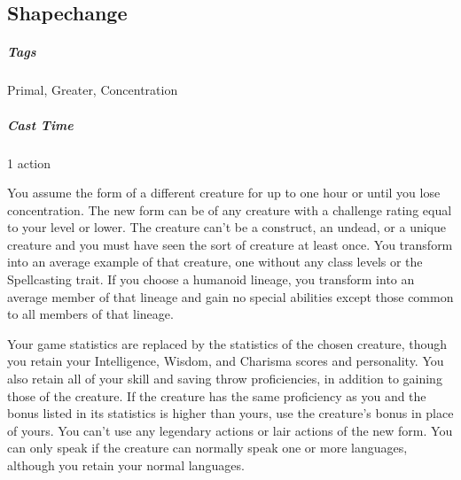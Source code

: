 








\subsection{Shapechange}\label{spell:shapechange}
\subparagraph*{Tags} Primal, Greater, Concentration
\subparagraph*{Cast Time} 1 action

You assume the form of a different creature for up to one hour or until you lose concentration. The new form can be of any creature with a challenge rating equal to your level or lower. The creature can't be a construct, an undead, or a unique creature and you must have seen the sort of creature at least once. You transform into an average example of that creature, one without any class levels or the Spellcasting trait. If you choose a humanoid lineage, you transform into an average member of that lineage and gain no special abilities except those common to all members of that lineage.

Your game statistics are replaced by the statistics of the chosen creature, though you retain your Intelligence, Wisdom, and Charisma scores and personality. You also retain all of your skill and saving throw proficiencies, in addition to gaining those of the creature. If the creature has the same proficiency as you and the bonus listed in its statistics is higher than yours, use the creature's bonus in place of yours. You can't use any legendary actions or lair actions of the new form. You can only speak if the creature can normally speak one or more languages, although you retain your normal languages.

